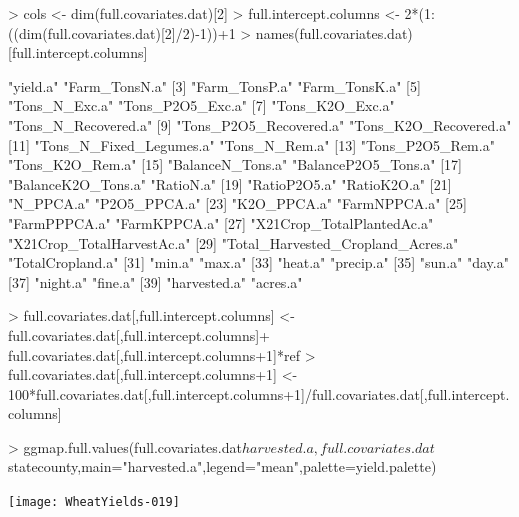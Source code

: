 \documentclass{report}
\begin{document}
\begin{Schunk}
\begin{Sinput}
> cols <- dim(full.covariates.dat)[2]
> full.intercept.columns <- 2*(1:((dim(full.covariates.dat)[2]/2)-1))+1
> names(full.covariates.dat)[full.intercept.columns]
\end{Sinput}
\begin{Soutput}
 [1] "yield.a"                          "Farm_TonsN.a"                    
 [3] "Farm_TonsP.a"                     "Farm_TonsK.a"                    
 [5] "Tons_N_Exc.a"                     "Tons_P2O5_Exc.a"                 
 [7] "Tons_K2O_Exc.a"                   "Tons_N_Recovered.a"              
 [9] "Tons_P2O5_Recovered.a"            "Tons_K2O_Recovered.a"            
[11] "Tons_N_Fixed_Legumes.a"           "Tons_N_Rem.a"                    
[13] "Tons_P2O5_Rem.a"                  "Tons_K2O_Rem.a"                  
[15] "BalanceN_Tons.a"                  "BalanceP2O5_Tons.a"              
[17] "BalanceK2O_Tons.a"                "RatioN.a"                        
[19] "RatioP2O5.a"                      "RatioK2O.a"                      
[21] "N_PPCA.a"                         "P2O5_PPCA.a"                     
[23] "K2O_PPCA.a"                       "FarmNPPCA.a"                     
[25] "FarmPPPCA.a"                      "FarmKPPCA.a"                     
[27] "X21Crop_TotalPlantedAc.a"         "X21Crop_TotalHarvestAc.a"        
[29] "Total_Harvested_Cropland_Acres.a" "TotalCropland.a"                 
[31] "min.a"                            "max.a"                           
[33] "heat.a"                           "precip.a"                        
[35] "sun.a"                            "day.a"                           
[37] "night.a"                          "fine.a"                          
[39] "harvested.a"                      "acres.a"                         
\end{Soutput}
\begin{Sinput}
> full.covariates.dat[,full.intercept.columns] <- full.covariates.dat[,full.intercept.columns]+ full.covariates.dat[,full.intercept.columns+1]*ref
> full.covariates.dat[,full.intercept.columns+1] <- 100*full.covariates.dat[,full.intercept.columns+1]/full.covariates.dat[,full.intercept.columns]
\end{Sinput}
\end{Schunk}


\begin{Schunk}
\begin{Sinput}
> ggmap.full.values(full.covariates.dat$harvested.a,full.covariates.dat$statecounty,main="harvested.a",legend="mean",palette=yield.palette)
\end{Sinput}
\end{Schunk}
\texttt{[image: WheatYields-019]}
\end{document}
